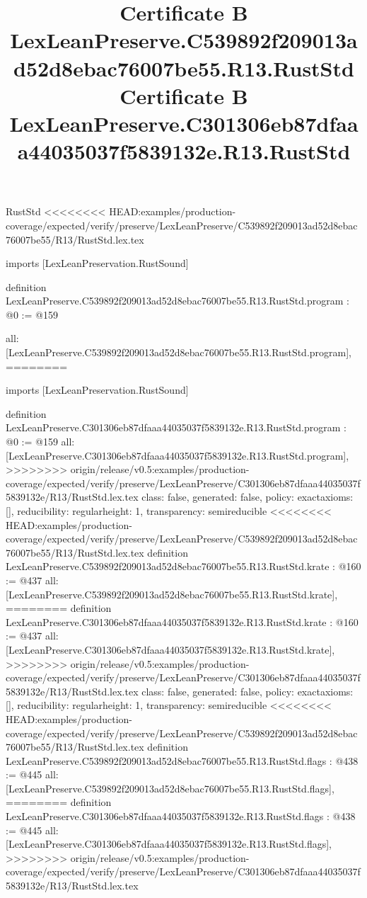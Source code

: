 \begin{lexlean}{RustStd}
<<<<<<<< HEAD:examples/production-coverage/expected/verify/preserve/LexLeanPreserve/C539892f209013ad52d8ebac76007be55/R13/RustStd.lex.tex
\title{Certificate B LexLeanPreserve.C539892f209013ad52d8ebac76007be55.R13.RustStd}
\begin{coremodule}
imports [LexLeanPreservation.RustSound]

definition LexLeanPreserve.C539892f209013ad52d8ebac76007be55.R13.RustStd.program : @0 := @159 {
  all: [LexLeanPreserve.C539892f209013ad52d8ebac76007be55.R13.RustStd.program],
========
\title{Certificate B LexLeanPreserve.C301306eb87dfaaa44035037f5839132e.R13.RustStd}
\begin{coremodule}
imports [LexLeanPreservation.RustSound]

definition LexLeanPreserve.C301306eb87dfaaa44035037f5839132e.R13.RustStd.program : @0 := @159 {
  all: [LexLeanPreserve.C301306eb87dfaaa44035037f5839132e.R13.RustStd.program],
>>>>>>>> origin/release/v0.5:examples/production-coverage/expected/verify/preserve/LexLeanPreserve/C301306eb87dfaaa44035037f5839132e/R13/RustStd.lex.tex
  class: false,
  generated: false,
  policy: exact{axioms: []},
  reducibility: regular{height: 1},
  transparency: semireducible
}
<<<<<<<< HEAD:examples/production-coverage/expected/verify/preserve/LexLeanPreserve/C539892f209013ad52d8ebac76007be55/R13/RustStd.lex.tex
definition LexLeanPreserve.C539892f209013ad52d8ebac76007be55.R13.RustStd.krate : @160 := @437 {
  all: [LexLeanPreserve.C539892f209013ad52d8ebac76007be55.R13.RustStd.krate],
========
definition LexLeanPreserve.C301306eb87dfaaa44035037f5839132e.R13.RustStd.krate : @160 := @437 {
  all: [LexLeanPreserve.C301306eb87dfaaa44035037f5839132e.R13.RustStd.krate],
>>>>>>>> origin/release/v0.5:examples/production-coverage/expected/verify/preserve/LexLeanPreserve/C301306eb87dfaaa44035037f5839132e/R13/RustStd.lex.tex
  class: false,
  generated: false,
  policy: exact{axioms: []},
  reducibility: regular{height: 1},
  transparency: semireducible
}
<<<<<<<< HEAD:examples/production-coverage/expected/verify/preserve/LexLeanPreserve/C539892f209013ad52d8ebac76007be55/R13/RustStd.lex.tex
definition LexLeanPreserve.C539892f209013ad52d8ebac76007be55.R13.RustStd.flags : @438 := @445 {
  all: [LexLeanPreserve.C539892f209013ad52d8ebac76007be55.R13.RustStd.flags],
========
definition LexLeanPreserve.C301306eb87dfaaa44035037f5839132e.R13.RustStd.flags : @438 := @445 {
  all: [LexLeanPreserve.C301306eb87dfaaa44035037f5839132e.R13.RustStd.flags],
>>>>>>>> origin/release/v0.5:examples/production-coverage/expected/verify/preserve/LexLeanPreserve/C301306eb87dfaaa44035037f5839132e/R13/RustStd.lex.tex
}}}
\end{coremodule}}
\end{coremodule}
\end{lexlean}
